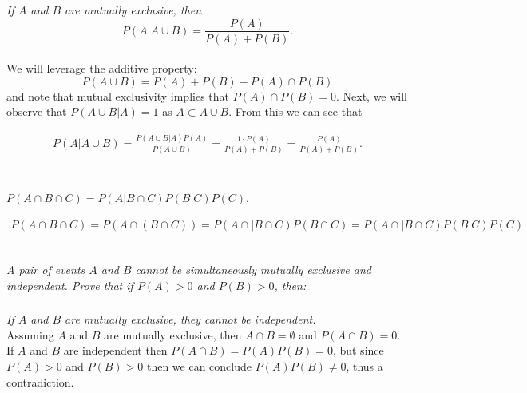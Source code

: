 \documentclass[12pt]{amsart}
\begin{document}
	\subsubsection{} \textit{If \(A\) and \(B\) are mutually exclusive, then}
		\[ P(A|A\cup B) = \frac{P(A)}{P(A) + P(B)}. \] \\
		
		We will leverage the additive property: 
		\[P(A\cup B) = P(A) + P(B) - P(A)\cap P(B)\]
		and note that mutual exclusivity implies that \(P(A)\cap P(B) = 0\).
		Next, we will observe that \(P(A\cup B|A)=1\) as \(A\subset A\cup B\). From this we can see that 
		
		\begin{align*}
			P(A|A\cup B) = \frac{P(A\cup B|A)P(A)}{P(A\cup B)}
			= \frac{1\cdot P(A)}{P(A) + P(B)}
			= \frac{P(A)}{P(A) + P(B)}.
		\end{align*} \\[1em]
		 
	\subsubsection{} \(P(A\cap B\cap C) = P(A|B\cap C) P(B|C) P(C)\).
	
	\begin{align*}
		P(A\cap B\cap C) 
		= P(A\cap (B\cap C)) 
		= P(A\cap | B\cap C) P(B\cap C) 
		= P(A\cap | B\cap C) P(B| C) P(C) \\
	\end{align*}

\clearpage
\subsection{} %
\textit{A pair of events \(A\) and \(B\) cannot be simultaneously mutually exclusive and independent.
	Prove that if \(P(A) > 0\) and \(P(B) > 0\), then:}
	\subsubsection{} \textit{If \(A\) and \(B\) are mutually exclusive, they cannot be independent.} \\
	
	Assuming \(A\) and \(B\) are mutually exclusive, then \(A\cap B = \emptyset\) and \(P(A\cap B)=0\).
	If \(A\) and \(B\) are independent then \(P(A\cap B) = P(A)P(B) = 0\),
	but since \(P(A) > 0\) and \(P(B) > 0\) then we can conclude \(P(A)P(B) \neq 0\), thus a contradiction. \\
	
\end{document}

